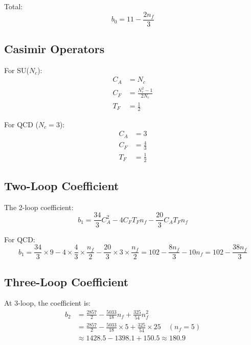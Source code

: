 \documentclass[11pt,a4paper]{article}
\theoremstyle{definition}
\begin{document}
Total:
\begin{equation}
\label{eq:beta-total}
b_0 = 11 - \frac{2n_f}{3}
\end{equation}

\subsection{Casimir Operators}
\label{subsec:casimir}

For SU($N_c$):
\begin{align}
\label{eq:casimir-ca}
C_A &= N_c \\
\label{eq:casimir-cf}
C_F &= \frac{N_c^2 - 1}{2N_c} \\
\label{eq:casimir-tf}
T_F &= \frac{1}{2}
\end{align}

For QCD ($N_c = 3$):
\begin{align}
\label{eq:casimir-qcd-ca}
C_A &= 3 \\
\label{eq:casimir-qcd-cf}
C_F &= \frac{4}{3} \\
\label{eq:casimir-qcd-tf}
T_F &= \frac{1}{2}
\end{align}

\subsection{Two-Loop Coefficient}
\label{subsec:two-loop-coeff}

The 2-loop coefficient:
\begin{equation}
\label{eq:b1-formula}
b_1 = \frac{34}{3}C_A^2 - 4C_F T_F n_f - \frac{20}{3}C_A T_F n_f
\end{equation}

For QCD:
\begin{equation}
\label{eq:b1-qcd}
b_1 = \frac{34}{3} \times 9 - 4 \times \frac{4}{3} \times \frac{n_f}{2}
    - \frac{20}{3} \times 3 \times \frac{n_f}{2}
    = 102 - \frac{8n_f}{3} - 10n_f
    = 102 - \frac{38n_f}{3}
\end{equation}

\subsection{Three-Loop Coefficient}
\label{subsec:three-loop-coeff}

At 3-loop, the coefficient is:
\begin{align}
\label{eq:b2-formula}
b_2 &= \frac{2857}{2} - \frac{5033}{18}n_f + \frac{325}{54}n_f^2 \\
\label{eq:b2-nf5}
&= \frac{2857}{2} - \frac{5033}{18} \times 5 + \frac{325}{54} \times 25 \quad (n_f = 5) \\
\label{eq:b2-value}
&\approx 1428.5 - 1398.1 + 150.5 \approx 180.9
\end{align}
\end{document}
